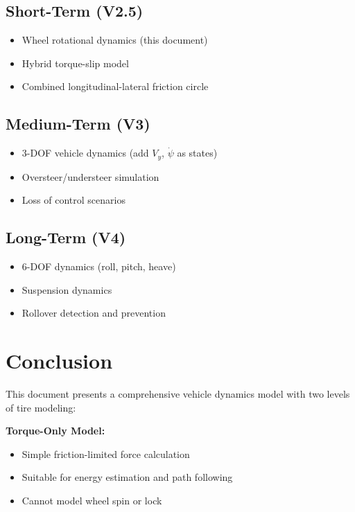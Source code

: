 \documentclass[11pt,a4paper]{article}
\begin{document}
\subsection{Short-Term (V2.5)}
\begin{itemize}
    \item[$\checkmark$] Wheel rotational dynamics (this document)
    \item[$\checkmark$] Hybrid torque-slip model
    \item Combined longitudinal-lateral friction circle
\end{itemize}

\subsection{Medium-Term (V3)}
\begin{itemize}
    \item 3-DOF vehicle dynamics (add $V_y$, $\dot{\psi}$ as states)
    \item Oversteer/understeer simulation
    \item Loss of control scenarios
\end{itemize}

\subsection{Long-Term (V4)}
\begin{itemize}
    \item 6-DOF dynamics (roll, pitch, heave)
    \item Suspension dynamics
    \item Rollover detection and prevention
\end{itemize}

\section{Conclusion}

This document presents a comprehensive vehicle dynamics model with two levels of tire modeling:

\textbf{Torque-Only Model:}
\begin{itemize}
    \item Simple friction-limited force calculation
    \item Suitable for energy estimation and path following
    \item Cannot model wheel spin or lock
\end{itemize}
\end{document}
